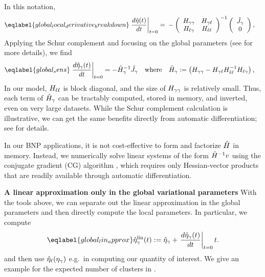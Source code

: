 In this notation,
%
\begin{align} \eqlabel{global_local_derivative_breakdown}
%
\fracat{d \etaopt(\t)}{d \t}{t = 0} ={}&
-\left(
\begin{array}{cc}
   \hess{\gamma\gamma} & \hess{\gamma\ell} \\
   \hess{\ell\gamma}     & \hess{\ell\ell} \\
\end{array}
\right)^{-1}
\left( \begin{array}{c} \crosshessian_\gamma \\ 0 \end{array}\right),
%
\end{align}
%
Applying the Schur complement and focusing on the global parameters (see  for more details), we find
%
\begin{align}\eqlabel{global_sens}
  \fracat{d \etaopt_\gamma(\t)}{d \t}{t = 0} &=
  - \hessopt_\gamma^{-1}\crosshessian_\gamma
  \mathwhere
  \hessopt_\gamma := \left(\hess{\gamma\gamma} -
        \hess{\gamma\ell} \hess{\ell\ell}^{-1} \hess{\ell\gamma}\right),
\end{align}
%
In our model, $H_{\ell\ell}$ is block diagonal, and the size of
$H_{\gamma\gamma}$ is relatively small. Thus, each term of $\hat{H}_\gamma$
can be tractably computed, stored in memory, and inverted, even on very large
datasets. While the Schur complement calculation is illustrative, we can get the
same benefits directly from automatic differentiation; see 
for details.

In our BNP applications, it is not cost-effective to form and factorize
$\hat{H}$ in memory.  Instead, we numerically solve linear systems of the form
$\hat{H}^{-1} v$ using the conjugate gradient (CG) algorithm \citep[Chapter
5]{nocedal:2006:numerical}, which requires only Hessian-vector products that
are readily available through automatic differentiation.

\noindent \textbf{A linear approximation only in the global variational parameters}
%
With the tools above, we can separate out the linear approximation in the global parameters
and then directly compute the local parameters. In particular,
we compute
%
\begin{align}\eqlabel{global_lin_approx}
  \etalin_\gamma(\t) := \etaopt_\gamma +
  \fracat{d \etaopt_\gamma(\t)}{d \t}{\t=0} \t .
\end{align}
%
and then use $\hat\eta_{\ell}(\eta_{\gamma})$ e.g.\ in computing our quantity of interest.
We give an example for the expected number of clusters in
.
